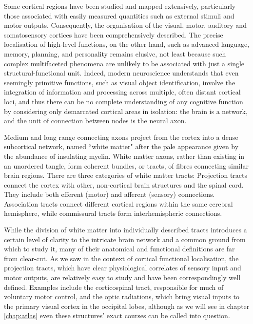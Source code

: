 Some cortical regions have been studied and mapped extensively, particularly those associated with easily measured quantities such as external stimuli and motor outputs.
Consequently, the organisation of the visual, motor, auditory and somatosensory cortices have been comprehensively described.
The precise localisation of high-level functions, on the other hand, such as advanced language, memory, planning, and personality remains elusive, not least because such complex multifaceted phenomena are unlikely to be associated with just a single structural-functional unit.\autocite{Catani2007}
Indeed, modern neuroscience understands that even seemingly primitive functions, such as visual object identification, involve the integration of information and processing across multiple, often distant cortical loci,\autocite{ffytche2005} and thus there can be no complete understanding of any cognitive function by considering only demarcated cortical areas in isolation: the brain is a network, and the unit of connection between nodes is the neural axon.

Medium and long range connecting axons project from the cortex into a dense subcortical network, named ``white matter" after the pale appearance given by the abundance of insulating myelin.
White matter axons, rather than existing in an unordered tangle, form coherent bundles, or tracts, of fibres connecting similar brain regions.
There are three categories of white matter tracts:
Projection tracts connect the cortex with other, non-cortical brain structures and the spinal cord.
They include both efferent (motor) and afferent (sensory) connections.
Association tracts connect different cortical regions within the same cerebral hemisphere, while commissural tracts form interhemispheric connections.

While the division of white matter into individually described tracts introduces a certain level of clarity to the intricate brain network and a common ground from which to study it, many of their anatomical and functional definitions are far from clear-cut.
As we saw in the context of cortical functional localisation, the projection tracts, which have clear physiological correlates of sensory input and motor outputs, are relatively easy to study and have been correspondingly well defined.
Examples include the corticospinal tract, responsible for much of voluntary motor control, and the optic radiations, which bring visual inputs to the primary visual cortex in the occipital lobes, although as we will see in chapter \ref{chap:atlas} even these structures' exact courses can be called into question.

